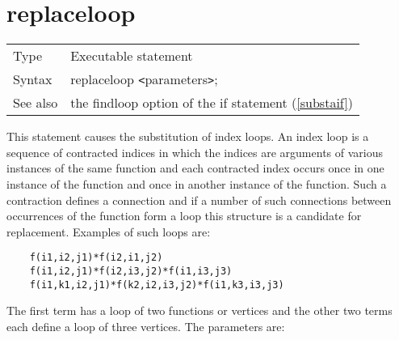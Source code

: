 
\section{replaceloop}
\label{substareplaceloop}

\noindent \begin{tabular}{ll}
Type & Executable statement\\
Syntax & replaceloop {\tt<}parameters{\tt>};
\\ See also & the findloop option of the if statement (\ref{substaif})
\end{tabular}\vspace{4mm}

\noindent This statement causes the substitution of 
index loops. An index loop is a 
sequence of contracted indices in which the indices are arguments of 
various instances of the same function and each contracted index occurs once in one instance of the 
function and once in another instance of the function. Such a contraction 
defines a connection and if a number of such connections between 
occurrences of the function form a loop this structure is a candidate for 
replacement. Examples of such loops are:
\begin{verbatim}
    f(i1,i2,j1)*f(i2,i1,j2)
    f(i1,i2,j1)*f(i2,i3,j2)*f(i1,i3,j3)
    f(i1,k1,i2,j1)*f(k2,i2,i3,j2)*f(i1,k3,i3,j3)
\end{verbatim}
The first term has a loop of two functions or vertices and 
the other two terms each define a loop of three vertices. The parameters 
are:






